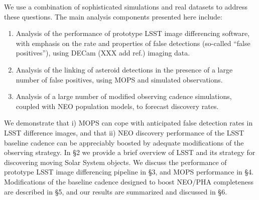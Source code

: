 We use a combination of sophisticated simulations and real datasets to address these questions.
The main analysis components presented here include: 
\begin{enumerate}
\item Analysis of the performance of prototype LSST image differencing software, with emphasis on the rate and 
    properties of false detections (so-called ``false positives''), using DECam (XXX add ref.) imaging data. 
\item Analysis of the linking of asteroid detections in the presence of a large number of false positives, using MOPS
         and simulated observations. 
\item Analysis of a large number of modified observing cadence simulations, coupled with NEO population
          models, to forecast discovery rates. 
\end{enumerate} 

We demonstrate that i) MOPS can cope with anticipated false detection rates 
in LSST difference images, and that ii) NEO discovery performance of the LSST baseline cadence
can be appreciably boosted by adequate modifications of the observing strategy. 
In \S2 we provide a brief overview of LSST and its strategy for discovering moving Solar 
System objects. We discuss the performance of prototype LSST image differencing pipeline  
in \S3, and MOPS performance in \S4. Modifications of the baseline cadence designed to 
boost NEO/PHA completeness are described in \S5, and our results are summarized and
discussed in \S6. 


